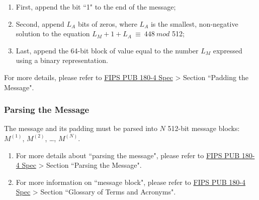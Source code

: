 \documentclass[main\_\_EN.tex]{subfiles}
\begin{document}
\begin{enumerate}
    \item First, append the bit ``1" to the end of the message;
    \item Second, append \begin{math} L_A \end{math} bits of zeros, where \begin{math} L_A \end{math} is the smallest, non-negative solution to the equation \begin{math}L_M + 1 + L_A \ {\equiv} \ 448 \ mod \end{math} 512;
    \item Last, append the 64-bit block of value equal to the number \begin{math} L_M \end{math} expressed using a binary representation.
\end{enumerate}

For more details, please refer to \href{https://doi.org/10.6028/NIST.FIPS.180-4}{FIPS PUB 180-4 Spec} > Section ``Padding the Message".

\subsubsection{Parsing the Message}\label{sec:ecdsa-msg-parsing}

The message and its padding must be parsed into \begin{math}N\end{math} 512-bit message blocks: \begin{math}M^{(1)}\end{math}, \begin{math}M^{(2)}\end{math}, \dots, \begin{math}M^{(N)}\end{math}.

\begin{tiplisting}
\begin{enumerate}
\vspace{-2.5em}
    \item For more details about ``parsing the message", please refer to \href{https://doi.org/10.6028/NIST.FIPS.180-4}{FIPS PUB 180-4 Spec} > Section ``Parsing the Message".
    \item For more information on ``message block", please refer to \href{https://doi.org/10.6028/NIST.FIPS.180-4}{FIPS PUB 180-4 Spec} > Section ``Glossary of Terms and Acronyms".
\end{enumerate}
\end{tiplisting}
\end{document}
